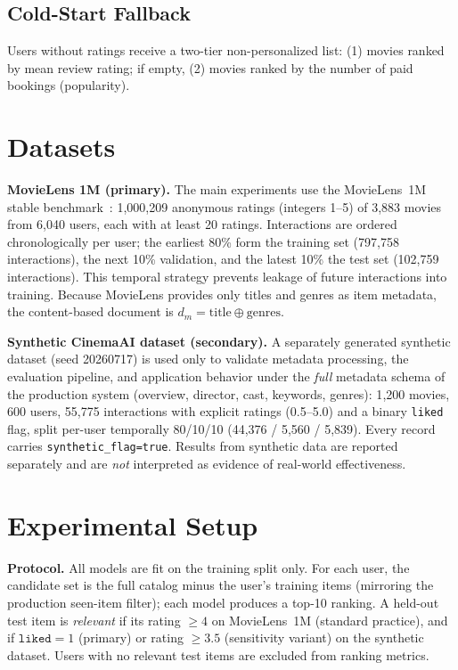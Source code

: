 \documentclass[conference]{IEEEtran}
\begin{document}
\subsection{Cold-Start Fallback}
Users without ratings receive a two-tier non-personalized list: (1) movies
ranked by mean review rating; if empty, (2) movies ranked by the number of
paid bookings (popularity).

\section{Datasets}\label{sec:datasets}
\textbf{MovieLens 1M (primary).} The main experiments use the MovieLens~1M
stable benchmark~\cite{harper2015movielens}: 1{,}000{,}209 anonymous ratings
(integers 1--5) of 3{,}883 movies from 6{,}040 users, each with at least 20
ratings. Interactions are ordered chronologically per user; the earliest 80\%
form the training set (797{,}758 interactions), the next 10\% validation, and
the latest 10\% the test set (102{,}759 interactions). This temporal strategy
prevents leakage of future interactions into training. Because MovieLens
provides only titles and genres as item metadata, the content-based document is
$d_m=\text{title}\oplus\text{genres}$.

\textbf{Synthetic CinemaAI dataset (secondary).} A separately generated
synthetic dataset (seed 20260717) is used only to validate metadata processing,
the evaluation pipeline, and application behavior under the \emph{full}
metadata schema of the production system (overview, director, cast, keywords,
genres): 1{,}200 movies, 600 users, 55{,}775 interactions with explicit ratings
(0.5--5.0) and a binary \texttt{liked} flag, split per-user temporally 80/10/10
(44{,}376 / 5{,}560 / 5{,}839). Every record carries
\texttt{synthetic\_flag=true}. Results from synthetic data are reported
separately and are \emph{not} interpreted as evidence of real-world
effectiveness.

\section{Experimental Setup}\label{sec:setup}
\textbf{Protocol.} All models are fit on the training split only. For each
user, the candidate set is the full catalog minus the user's training items
(mirroring the production seen-item filter); each model produces a top-10
ranking. A held-out test item is \emph{relevant} if its rating $\ge 4$ on
MovieLens~1M (standard practice), and if $\texttt{liked}=1$ (primary) or rating
$\ge 3.5$ (sensitivity variant) on the synthetic dataset. Users with no
relevant test items are excluded from ranking metrics.
\end{document}
